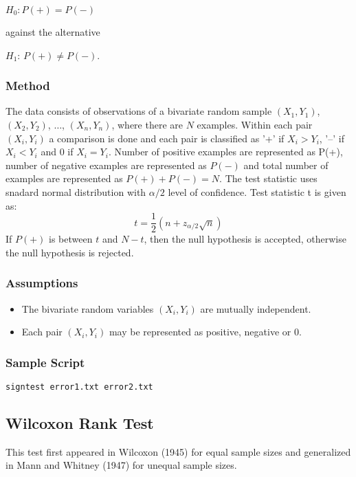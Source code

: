 \documentclass[a4paper,12pt]{book}
\begin{document}
\begin{center}
$H_0: P(+)=P(-)$
\end{center}
against the alternative
\begin{center}
$H_1$: $P(+)\neq P(-)$.
\end{center}

\subsubsection{Method}
The data consists of observations of a bivariate random sample $(X_1, Y_1)$, $(X_2, Y_2)$, $\ldots$, $(X_n, Y_n)$, where there are $N$ examples. Within each pair $(X_i, Y_i)$ a comparison is done and each pair is classified as '+' if $X_i > Y_i$, '--' if $X_i < Y_i$ and 0 if $X_i = Y_i$. Number of positive examples are represented as P(+), number of negative examples are represented as $P(-)$ and total number of examples are represented as $P(+) + P(-) = N$. The test statistic uses snadard normal distribution with $\alpha / 2$ level of confidence. Test statistic t is given as:
\begin{equation}
t = \frac{1}{2}(n + z_{\alpha/2}\sqrt{n})
\end{equation}
If $P(+)$ is between $t$ and $N - t$, then the null hypothesis is accepted, otherwise the null hypothesis is rejected.

\subsubsection{Assumptions}
\begin{itemize}
\item The bivariate random variables $(X_i, Y_i)$ are mutually independent.
\item Each pair $(X_i, Y_i)$ may be represented as positive, negative or 0.
\end{itemize}

\subsubsection{Sample Script}
\begin{verbatim}
signtest error1.txt error2.txt
\end{verbatim}

\subsection{Wilcoxon Rank Test}
This test first appeared in Wilcoxon (1945) for equal sample sizes and generalized in Mann and Whitney (1947) for unequal sample sizes.
\end{document}
